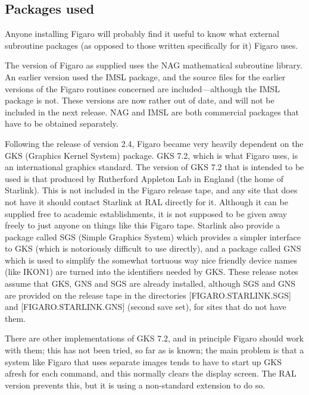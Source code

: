 \subsection{Packages used}

Anyone installing Figaro will probably find it useful to know what
external subroutine packages (as opposed to those written specifically
for it) Figaro uses.

The version of Figaro as supplied uses the NAG mathematical subroutine library.
An earlier version used the IMSL package, and the source files for the earlier
versions of the Figaro routines concerned are included---although the IMSL
package is not. These versions are now rather out of date, and will not be
included in the next release. NAG and IMSL are both commercial packages that
have to be obtained separately.

Following the release of version 2.4, Figaro became very heavily dependent on
the GKS (Graphics Kernel System) package. GKS 7.2, which is what Figaro uses,
is an international graphics standard. The version of GKS 7.2 that is intended
to be used is that produced by Rutherford Appleton Lab in England (the home of
Starlink). This is not included in the Figaro release tape, and any site that
does not have it should contact Starlink at RAL directly for it.  Although it
can be supplied free to academic establishments, it is not supposed to be given
away freely to just anyone on things like this Figaro  tape. Starlink also
provide a package called SGS (Simple Graphics System) which provides a simpler
interface to GKS (which is notoriously difficult to use directly), and a
package called GNS which is used to simplify the somewhat tortuous way nice
friendly device names (like IKON1) are  turned into the identifiers needed by
GKS. These release notes assume that GKS, GNS and SGS are already installed,
although SGS and GNS are provided  on the release tape in the directories
[FIGARO.STARLINK.SGS] and [FIGARO.STARLINK.GNS] (second save set), for sites
that do not have them.

There are other implementations of GKS 7.2, and in principle Figaro  should
work with them; this has not been tried, so far as is known; the main problem
is that a system like Figaro that uses separate images tends to have to start
up GKS afresh for each command, and this normally clears the display screen.
The RAL version prevents this, but it is using a non-standard extension to do
so.

